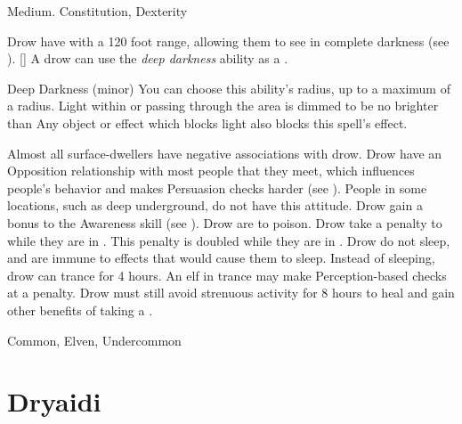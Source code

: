      Medium.
      Constitution,  Dexterity
    \begin{itemize}
         Drow have  with a 120 foot range, allowing them to see in complete darkness (see ).
        [\sparkle] A drow can use the \textit{deep darkness} ability as a .
            \begin{magicalsustainability}{Deep Darkness}{ (minor)}
                \rankline
                You can choose this ability's radius, up to a maximum of a \areamed radius.
                Light within or passing through the area is dimmed to be no brighter than 
                Any object or effect which blocks light also blocks this spell's effect.
            \end{magicalsustainability}
         Almost all surface-dwellers have negative associations with drow.
            Drow have an Opposition relationship with most people that they meet, which influences people's behavior and makes Persuasion checks harder (see ).
            People in some locations, such as deep underground, do not have this attitude.
         Drow gain a  bonus to the Awareness skill (see ).
         Drow are  to poison.
         Drow take a  penalty to  while they are in .
            This penalty is doubled while they are in .
         Drow do not sleep, and are immune to \magical effects that would cause them to sleep.
            Instead of sleeping, drow can trance for 4 hours.
            An elf in trance may make Perception-based checks at a  penalty.
            Drow must still avoid strenuous activity for 8 hours to heal and gain other benefits of taking a .
    \end{itemize}
     Common, Elven, Undercommon

\section{Dryaidi}

